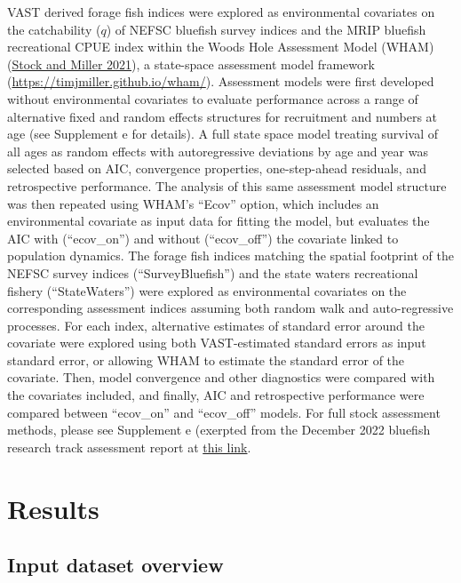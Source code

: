 \documentclass[
]{article}
\begin{document}
VAST derived forage fish indices were explored as environmental covariates on the catchability (\(q\)) of NEFSC bluefish survey indices and the MRIP bluefish recreational CPUE index within the Woods Hole Assessment Model (WHAM) (\protect\hyperlink{ref-stock_woods_2021}{Stock and Miller 2021}), a state-space assessment model framework (\url{https://timjmiller.github.io/wham/}). Assessment models were first developed without environmental covariates to evaluate performance across a range of alternative fixed and random effects structures for recruitment and numbers at age (see Supplement e for details). A full state space model treating survival of all ages as random effects with autoregressive deviations by age and year was selected based on AIC, convergence properties, one-step-ahead residuals, and retrospective performance. The analysis of this same assessment model structure was then repeated using WHAM's ``Ecov'' option, which includes an environmental covariate as input data for fitting the model, but evaluates the AIC with (``ecov\_on'') and without (``ecov\_off'') the covariate linked to population dynamics. The forage fish indices matching the spatial footprint of the NEFSC survey indices (``SurveyBluefish'') and the state waters recreational fishery (``StateWaters'') were explored as environmental covariates on the corresponding assessment indices assuming both random walk and auto-regressive processes. For each index, alternative estimates of standard error around the covariate were explored using both VAST-estimated standard errors as input standard error, or allowing WHAM to estimate the standard error of the covariate. Then, model convergence and other diagnostics were compared with the covariates included, and finally, AIC and retrospective performance were compared between ``ecov\_on'' and ``ecov\_off'' models. For full stock assessment methods, please see Supplement e (exerpted from the December 2022 bluefish research track assessment report at \href{https://apps-nefsc.fisheries.noaa.gov/saw/sasi_files.php?year=2022\&species_id=32\&stock_id=6\&review_type_id=5\&info_type_id=-1\&map_type_id=\&filename=Bluefish_SAW_SARC_2022_FINAL.pdf}{this link}.

\hypertarget{results}{%
\section{Results}\label{results}}

\hypertarget{input-dataset-overview}{%
\subsection{Input dataset overview}\label{input-dataset-overview}}
\end{document}
